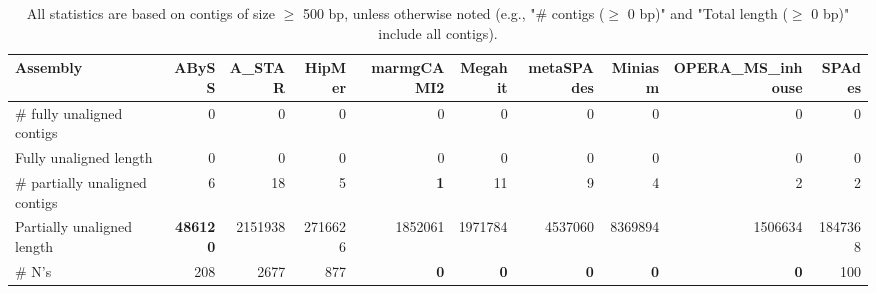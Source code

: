 \documentclass[12pt,a4paper]{article}
\begin{document}
\begin{table}[ht]
\begin{center}
\caption{All statistics are based on contigs of size $\geq$ 500 bp, unless otherwise noted (e.g., "\# contigs ($\geq$ 0 bp)" and "Total length ($\geq$ 0 bp)" include all contigs).}
\begin{tabular}{|l*{9}{|r}|}
\hline
Assembly & ABySS & A\_STAR & HipMer & marmgCAMI2 & Megahit & metaSPAdes & Miniasm & OPERA\_MS\_inhouse & SPAdes \\ \hline
\# fully unaligned contigs & 0 & 0 & 0 & 0 & 0 & 0 & 0 & 0 & 0 \\ \hline
Fully unaligned length & 0 & 0 & 0 & 0 & 0 & 0 & 0 & 0 & 0 \\ \hline
\# partially unaligned contigs & 6 & 18 & 5 & {\bf 1} & 11 & 9 & 4 & 2 & 2 \\ \hline
Partially unaligned length & {\bf 486120} & 2151938 & 2716626 & 1852061 & 1971784 & 4537060 & 8369894 & 1506634 & 1847368 \\ \hline
\# N's & 208 & 2677 & 877 & {\bf 0} & {\bf 0} & {\bf 0} & {\bf 0} & {\bf 0} & 100 \\ \hline
\end{tabular}
\end{center}
\end{table}
\end{document}
